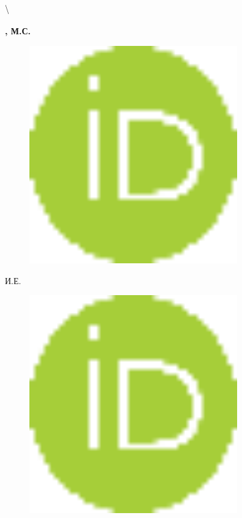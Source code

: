 \textbackslash{} {\bfseries \textsuperscript{\envelope }, М.С.
\begin{figure}[H]
	\centering
	\includegraphics[width=0.8\textwidth]{media/pish2/image5}
	\caption*{}
\end{figure}

И.Е.
\begin{figure}[H]
	\centering
	\includegraphics[width=0.8\textwidth]{media/pish2/image5}
	\caption*{}
\end{figure}


}
